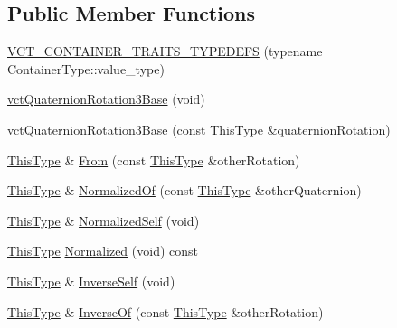\subsection*{Public Member Functions}
\begin{DoxyCompactItemize}
\item 
\hyperlink{classvct_quaternion_rotation3_base_af57e4c02fd70dc7ec1d58e0b44a624fd}{V\+C\+T\+\_\+\+C\+O\+N\+T\+A\+I\+N\+E\+R\+\_\+\+T\+R\+A\+I\+T\+S\+\_\+\+T\+Y\+P\+E\+D\+E\+F\+S} (typename Container\+Type\+::value\+\_\+type)
\item 
\hyperlink{classvct_quaternion_rotation3_base_a1dea4cd579703f66bf163b69bca5a96b}{vct\+Quaternion\+Rotation3\+Base} (void)
\item 
\hyperlink{classvct_quaternion_rotation3_base_a8376b96adbf771b1391074e1d2e58ad7}{vct\+Quaternion\+Rotation3\+Base} (const \hyperlink{classvct_quaternion_base_af28efdc38acf89acb7a67afada11408c}{This\+Type} \&quaternion\+Rotation)
\item 
\hyperlink{classvct_quaternion_base_af28efdc38acf89acb7a67afada11408c}{This\+Type} \& \hyperlink{classvct_quaternion_rotation3_base_a3a428d19b8f48077b8276997cfd60c93}{From} (const \hyperlink{classvct_quaternion_base_af28efdc38acf89acb7a67afada11408c}{This\+Type} \&other\+Rotation)
\item 
\hyperlink{classvct_quaternion_base_af28efdc38acf89acb7a67afada11408c}{This\+Type} \& \hyperlink{classvct_quaternion_rotation3_base_a2152103b5a4f8a92f397ba8aa2e9c3e1}{Normalized\+Of} (const \hyperlink{classvct_quaternion_base_af28efdc38acf89acb7a67afada11408c}{This\+Type} \&other\+Quaternion)
\item 
\hyperlink{classvct_quaternion_base_af28efdc38acf89acb7a67afada11408c}{This\+Type} \& \hyperlink{classvct_quaternion_rotation3_base_a83d65d4063a0bcd1db35fec895bb3793}{Normalized\+Self} (void)
\item 
\hyperlink{classvct_quaternion_base_af28efdc38acf89acb7a67afada11408c}{This\+Type} \hyperlink{classvct_quaternion_rotation3_base_a5eb2e79d6a9cd3993a847791760d0d7b}{Normalized} (void) const 
\item 
\hyperlink{classvct_quaternion_base_af28efdc38acf89acb7a67afada11408c}{This\+Type} \& \hyperlink{classvct_quaternion_rotation3_base_a0a94bc0c71fff5b80ae821faddbeaf4c}{Inverse\+Self} (void)
\item 
\hyperlink{classvct_quaternion_base_af28efdc38acf89acb7a67afada11408c}{This\+Type} \& \hyperlink{classvct_quaternion_rotation3_base_aa8b668cab41b415642137c6eb93508b9}{Inverse\+Of} (const \hyperlink{classvct_quaternion_base_af28efdc38acf89acb7a67afada11408c}{This\+Type} \&other\+Rotation)

\end{DoxyCompactItemize}
